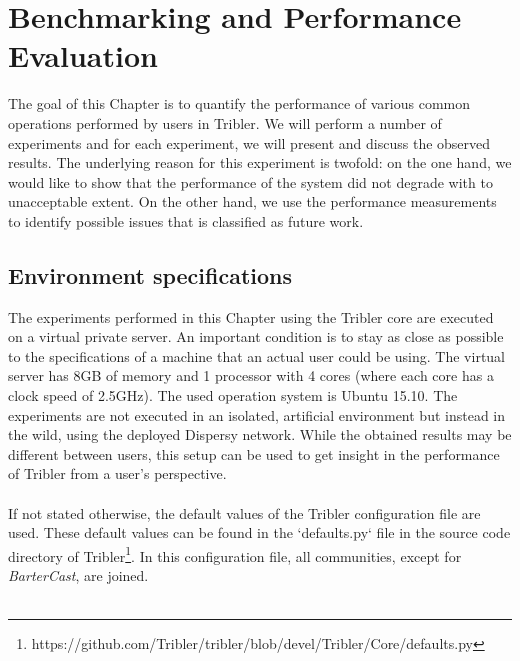 \chapter{Benchmarking and Performance Evaluation}
\label{chapter:experiments}

The goal of this Chapter is to quantify the performance of various common operations performed by users in Tribler. We will perform a number of experiments and for each experiment, we will present and discuss the observed results. The underlying reason for this experiment is twofold: on the one hand, we would like to show that the performance of the system did not degrade with to unacceptable extent. On the other hand, we use the performance measurements to identify possible issues that is classified as future work.

\section{Environment specifications}
The experiments performed in this Chapter using the Tribler core are executed on a virtual private server. An important condition is to stay as close as possible to the specifications of a machine that an actual user could be using. The virtual server has 8GB of memory and 1 processor with 4 cores (where each core has a clock speed of 2.5GHz). The used operation system is Ubuntu 15.10. The experiments are not executed in an isolated, artificial environment but instead in the wild, using the deployed Dispersy network. While the obtained results may be different between users, this setup can be used to get insight in the performance of Tribler from a user's perspective.\\\\
If not stated otherwise, the default values of the Tribler configuration file are used. These default values can be found in the `defaults.py` file in the source code directory of Tribler\footnote{https://github.com/Tribler/tribler/blob/devel/Tribler/Core/defaults.py}. In this configuration file, all communities, except for \emph{BarterCast}, are joined.\\\\
